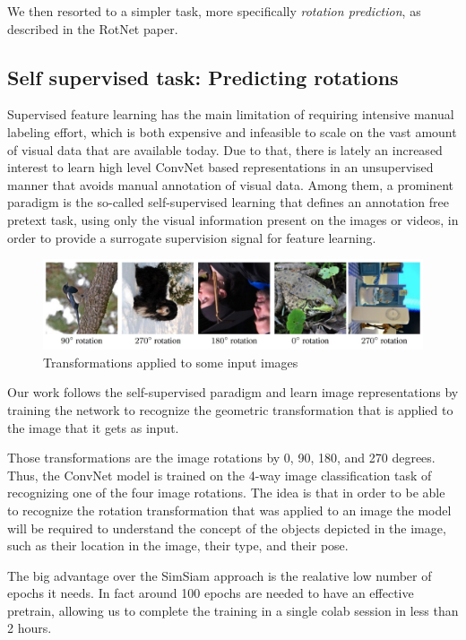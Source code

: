 \documentclass{article}
\begin{document}
\begin{flushleft}
We then resorted to a simpler task, more specifically \emph{rotation prediction}, 
as described in the RotNet paper.
\end{flushleft}
\subsection{Self supervised task: Predicting rotations}
\begin{flushleft}
Supervised feature learning has the main limitation of requiring intensive manual labeling effort, which is both expensive and
infeasible to scale on the vast amount of visual data that are available today.
Due to that, there is lately an increased interest to learn high level ConvNet based representations
in an unsupervised manner that avoids manual annotation of visual data.
Among them, a prominent paradigm is the so-called self-supervised learning that defines an annotation free pretext task,
using only the visual information present on the images or videos, in order to provide a surrogate
supervision signal for feature learning.
\end{flushleft}
\begin{flushleft}
    \begin{figure}[h]
        \centering
        \includegraphics[scale=0.5]{rotations}
        \caption{Transformations applied to some input images }
    \end{figure}
Our work follows the self-supervised paradigm and learn image representations by training the network to recognize the geometric transformation that is applied to the image that it gets as
input. 

Those transformations are the image rotations by 0, 90, 180, and 270 degrees. Thus,
the ConvNet model is trained on the 4-way image classification task of recognizing one of the four
image rotations. The idea is that in order to be able to recognize the
rotation transformation that was applied to an image the model will be required to understand the concept of
the objects depicted in the image, such as their location in the image, their type, and
their pose.
\end{flushleft}
\begin{flushleft}
The big advantage over the SimSiam approach is the realative low number of epochs it needs. 
In fact around 100 epochs are needed to have an effective pretrain, allowing us to complete the training in a 
single colab session in less than 2 hours.
\end{flushleft}
\end{document}
